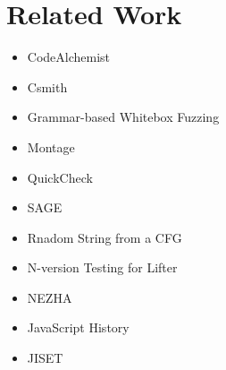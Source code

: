 \section{Related Work}\label{sec:related}

\begin{itemize}
  \item CodeAlchemist\cite{codealchemist}
  \item Csmith\cite{csmith}
  \item Grammar-based Whitebox Fuzzing\cite{grammar-whitebox}
  \item Montage\cite{montage}
  \item QuickCheck\cite{quickcheck}
  \item SAGE\cite{sage}
  \item Rnadom String from a CFG\cite{cfg-gen}
  \item N-version Testing for Lifter\cite{ir-diff-test}
  \item NEZHA\cite{nezha}
  \item JavaScript History\cite{js-hopl}
  \item JISET\cite{jiset}

\end{itemize}
